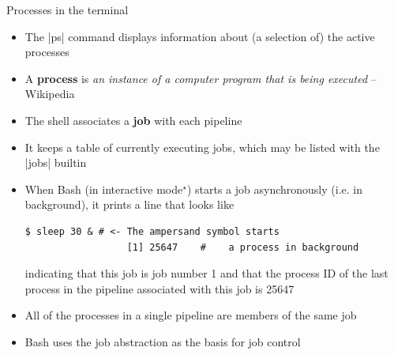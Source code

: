 
\begin{frame}[fragile]{Processes in the terminal}{}
    \vspace{-1mm}
    \begin{itemize}
        \item The \bash|ps| command displays information about (a selection of) the active processes
        \item A \alert{\textbf{process}} is \emph{\guillemotleft an instance of a computer program that is being executed\guillemotright} -- Wikipedia
        \item The shell associates a \alert{\textbf{job}} with each pipeline
        \item It keeps a table of currently executing jobs, which may be listed with the \bash|jobs| builtin
        \item When Bash (in interactive mode$^\star$) starts a job asynchronously (i.e. in background), it prints a line that looks like
              \begin{lstlisting}[style=MyBash, numbers=none, aboveskip=2mm, belowskip=-5mm, xrightmargin=25mm]
                  $ sleep 30 & # <- The ampersand symbol starts
                  [1] 25647    #    a process in background
              \end{lstlisting}
              indicating that this job is job number 1 and that the process ID of the last process in the pipeline associated with this job is 25647
        \item All of the processes in a single pipeline are members of the same job
        \item Bash uses the job abstraction as the basis for job control
    \end{itemize}
\end{frame}

